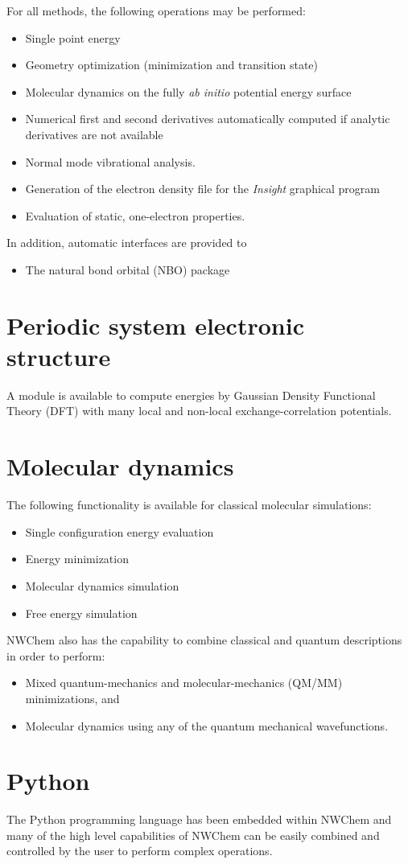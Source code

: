 For all methods, the following operations may be performed:
\begin{itemize}
\item Single point energy
\item Geometry optimization (minimization and transition state)
\item Molecular dynamics on the fully {\em ab initio} potential energy
  surface
\item Numerical first and second derivatives automatically computed if
  analytic derivatives are not available
\item Normal mode vibrational analysis.
\item Generation of the electron density file for the {\em Insight}
      graphical program
\item Evaluation of static, one-electron properties.
\end{itemize}

In addition, automatic interfaces are provided to
\begin{itemize}
\item The natural bond orbital (NBO) package
\end{itemize}

\section{Periodic system electronic structure}

A module is available to compute energies by Gaussian Density
Functional Theory (DFT) with many local and non-local
exchange-correlation potentials.

\section{Molecular dynamics}

The following functionality is available for classical molecular
simulations:
\begin{itemize}
\item Single configuration energy evaluation
\item Energy minimization
\item Molecular dynamics simulation
\item Free energy simulation 
\end{itemize}

NWChem also has the capability to combine classical and quantum
descriptions in order to perform:
\begin{itemize}
\item Mixed quantum-mechanics and molecular-mechanics (QM/MM)
  minimizations, and
\item Molecular dynamics using any of the quantum
  mechanical wavefunctions.
\end{itemize}

\section{Python}

The Python programming language has been embedded within NWChem and
many of the high level capabilities of NWChem can be easily combined
and controlled by the user to perform complex operations.
